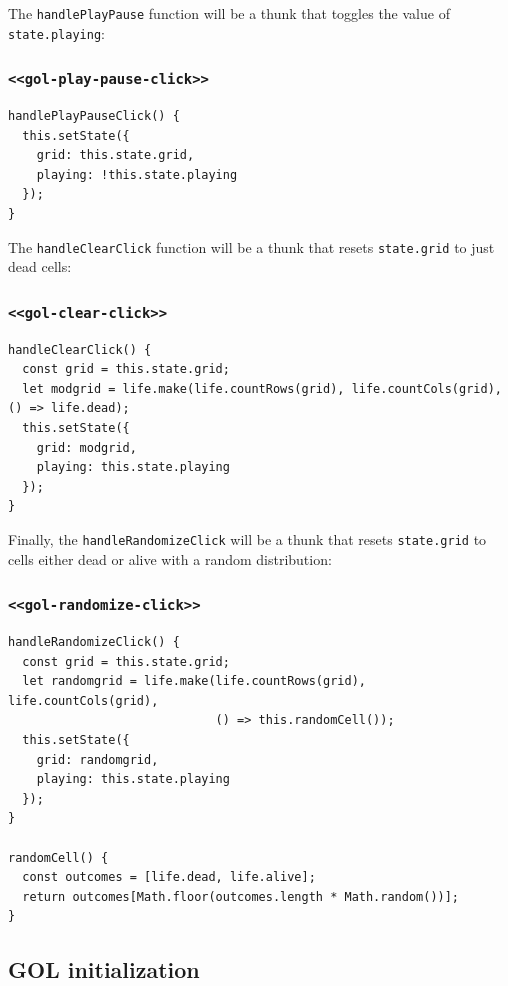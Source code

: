 \documentclass[11pt]{article}
\begin{document}
The \texttt{handlePlayPause} function will be a thunk that toggles the value of \texttt{state.playing}:

\subsubsection{\texttt{<<gol-play-pause-click>>}}
\label{sec:org8e55a88}
\begin{verbatim}
handlePlayPauseClick() {
  this.setState({
    grid: this.state.grid,
    playing: !this.state.playing
  });
}
\end{verbatim}

The \texttt{handleClearClick} function will be a thunk that resets \texttt{state.grid} to just dead cells:

\subsubsection{\texttt{<<gol-clear-click>>}}
\label{sec:org5659879}
\begin{verbatim}
handleClearClick() {
  const grid = this.state.grid;
  let modgrid = life.make(life.countRows(grid), life.countCols(grid), () => life.dead);
  this.setState({
    grid: modgrid,
    playing: this.state.playing
  });
}
\end{verbatim}

Finally, the \texttt{handleRandomizeClick} will be a thunk that resets \texttt{state.grid} to cells either dead or alive with a random distribution:

\subsubsection{\texttt{<<gol-randomize-click>>}}
\label{sec:orgf3470e5}
\begin{verbatim}
handleRandomizeClick() {
  const grid = this.state.grid;
  let randomgrid = life.make(life.countRows(grid), life.countCols(grid),
                             () => this.randomCell());
  this.setState({
    grid: randomgrid,
    playing: this.state.playing
  });
}

randomCell() {
  const outcomes = [life.dead, life.alive];
  return outcomes[Math.floor(outcomes.length * Math.random())];
}
\end{verbatim}

\subsection{GOL initialization}
\label{sec:org5c5290e}
\end{document}
